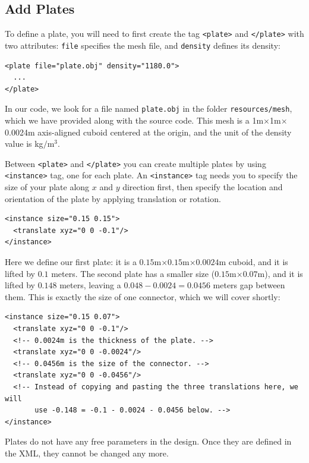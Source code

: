 \subsection{Add Plates}
To define a plate, you will need to first create the tag \texttt{<plate>} and \texttt{</plate>} with two attributes: \texttt{file} specifies the mesh file, and \texttt{density} defines its density:
\begin{verbatim}
<plate file="plate.obj" density="1180.0">
  ...
</plate>
\end{verbatim}
In our code, we look for a file named \texttt{plate.obj} in the folder \texttt{resources/mesh}, which we have provided along with the source code. This mesh is a 1m$\times$1m$\times$0.0024m axis-aligned cuboid centered at the origin, and the unit of the density value is kg$/$m$^3$.

Between \texttt{<plate>} and \texttt{</plate>} you can create multiple plates by using \texttt{<instance>} tag, one for each plate. An \texttt{<instance>} tag needs you to specify the size of your plate along $x$ and $y$ direction first, then specify the location and orientation of the plate by applying translation or rotation.
\begin{verbatim}
<instance size="0.15 0.15">
  <translate xyz="0 0 -0.1"/>
</instance>
\end{verbatim}
Here we define our first plate: it is a $0.15$m$\times0.15$m$\times0.0024$m cuboid, and it is lifted by $0.1$ meters. The second plate has a smaller size ($0.15$m$\times0.07$m), and it is lifted by $0.148$ meters, leaving a $0.048-0.0024=0.0456$ meters gap between them. This is exactly the size of one connector, which we will cover shortly:
\begin{verbatim}
<instance size="0.15 0.07">
  <translate xyz="0 0 -0.1"/>
  <!-- 0.0024m is the thickness of the plate. -->
  <translate xyz="0 0 -0.0024"/>
  <!-- 0.0456m is the size of the connector. -->
  <translate xyz="0 0 -0.0456"/>
  <!-- Instead of copying and pasting the three translations here, we will
       use -0.148 = -0.1 - 0.0024 - 0.0456 below. -->
</instance>
\end{verbatim}

Plates do not have any free parameters in the design. Once they are defined in the XML, they cannot be changed any more.

